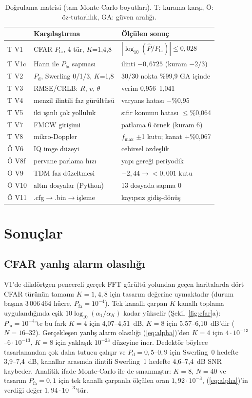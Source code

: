\documentclass[conference,a4paper,10pt]{IEEEtran}
\newcommand{\Pfa}{P_{\mathrm{fa}}}
\newcommand{\Pd}{P_{\mathrm{d}}}
\begin{document}
\begin{table}[!t]
\caption{Doğrulama matrisi (tam Monte-Carlo boyutları). T: kurama karşı, Ö: öz-tutarlılık, GA: güven aralığı.}
\label{tab:val}
\centering\scriptsize
\setlength{\tabcolsep}{2.5pt}
\begin{tabular}{@{}l l l@{}}
\toprule
 & Karşılaştırma & Ölçülen sonuç \\
\midrule
T V1 & CFAR $\Pfa$, 4 tür, $K$=1,4,8 & $|\log_{10}(\hat P/\Pfa)|\leq0{,}028$\\
T V1c & Hann ile $\Pfa$ sapması & ilinti $-0{,}6725$ (kuram $-2/3$)\\
T V2 & $\Pd$, Swerling 0/1/3, $K$=1,8 & 30/30 nokta \%99,9 GA içinde\\
T V3 & RMSE/CRLB: $R$, $v$, $\theta$ & verim 0,956--1,041\\
T V4 & menzil ilintili faz gürültüsü & varyans hatası $-$\%0,95\\
T V5 & iki ışınlı çok yolluluk & sıfır konumu hatası $\leq$\%0,064\\
T V7 & FMCW girişimi & patlama 6 örnek (kuram 6)\\
T V8 & mikro-Doppler & $f_{\max}$ $\pm$1 kutu; kanat $+$\%0,067\\
\midrule
Ö V6 & IQ imge düzeyi & cebirsel özdeşlik\\
Ö V8f & pervane parlama hızı & yapı gereği periyodik\\
Ö V9 & TDM faz düzeltmesi & $-2{,}44\to<0{,}001$ kutu\\
Ö V10 & altın dosyalar (Python) & 13 dosyada sapma 0\\
Ö V11 & .cfg$\to$.bin$\to$işleme & kayıpsız gidiş-dönüş\\
\bottomrule
\end{tabular}
\end{table}

\section{Sonuçlar}
\subsection{CFAR yanlış alarm olasılığı}
V1'de dikdörtgen pencereli gerçek FFT gürültü yolundan geçen haritalarda dört CFAR türünün tamamı $K=1,4,8$ için tasarım değerine uymaktadır (durum başına 3\,006\,464 hücre, $\Pfa=10^{-4}$). Tek kanallı çarpan $K$ kanallı toplama uygulandığında eşik $10\log_{10}(\alpha_1/\alpha_K)$ kadar yükselir (Şekil~\ref{fig:cfar}a): $\Pfa=10^{-4}$'te bu fark $K=4$ için 4,07--4,51~dB, $K=8$ için 5,57--6,10~dB'dir ($N=16$--$32$). Gerçekleşen yanlış alarm olasılığı (\ref{eq:alpha})'den $K=4$ için $4\cdot10^{-13}$--$6\cdot10^{-13}$, $K=8$ için yaklaşık $10^{-23}$ düzeyine iner. Dedektör böylece tasarlanandan çok daha tutucu çalışır ve $\Pd=0{,}5$--$0{,}9$ için Swerling~0 hedefte 3,9--7,4~dB, kanallar arasında ilintili Swerling~1 hedefte 4,6--7,4~dB SNR kaybeder. Analitik ifade Monte-Carlo ile de sınanmıştır: $K=8$, $N=40$ ve tasarım $\Pfa=0{,}1$ için tek kanallı çarpanla ölçülen oran $1{,}92\cdot10^{-3}$, (\ref{eq:alpha})'in verdiği değer $1{,}94\cdot10^{-3}$'tür.
\end{document}

